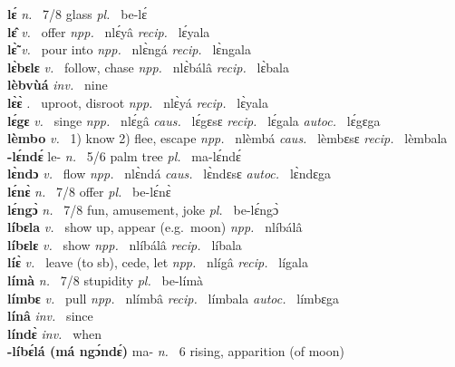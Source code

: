{\bfseries lɛ́}  {\itshape n.~} 7/8 glass {\itshape pl.~} be-lɛ́    \\ 
{\bfseries lɛ̂}  {\itshape v.~} offer   {\itshape npp.~} nlɛ́yâ {\itshape recip.~} lɛ́yala  \\ 
{\bfseries lɛ̃̀}  {\itshape v.~} pour into   {\itshape npp.~} nlɛ̀ngá {\itshape recip.~} lɛ̀ngala  \\ 
{\bfseries lɛ̀bɛlɛ}  {\itshape v.~} follow, chase   {\itshape npp.~} nlɛ̀bálâ {\itshape recip.~} lɛ̀bala  \\ 
{\bfseries lèbvùá}  {\itshape inv.~} nine    \\ 
{\bfseries lɛ̀ɛ̀}  {\itshape .~} uproot, disroot   {\itshape npp.~} nlɛ̀yá {\itshape recip.~} lɛ̀yala  \\ 
{\bfseries lɛ́gɛ}  {\itshape v.~} singe   {\itshape npp.~} nlɛ́gâ {\itshape caus.~} lɛ́gɛsɛ {\itshape recip.~} lɛ́gala {\itshape autoc.~} lɛ́gɛga  \\ 
{\bfseries lèmbo}  {\itshape v.~} 1) know 2) flee, escape   {\itshape npp.~} nlèmbá {\itshape caus.~} lèmbɛsɛ {\itshape recip.~} lèmbala \\ 
{\bfseries -lɛ́ndɛ́} le- {\itshape n.~} 5/6 palm tree {\itshape pl.~} ma-lɛ́ndɛ́    \\ 
{\bfseries lɛ̀ndɔ}  {\itshape v.~} flow   {\itshape npp.~} nlɛ̀ndá {\itshape caus.~} lɛ̀ndɛsɛ {\itshape autoc.~} lɛ̀ndɛga  \\ 
{\bfseries lɛ́nɛ̀}  {\itshape n.~} 7/8 offer {\itshape pl.~} be-lɛ́nɛ̀    \\ 
{\bfseries lɛ́ngɔ̀}  {\itshape n.~} 7/8 fun, amusement, joke {\itshape pl.~} be-lɛ́ngɔ̀    \\ 
{\bfseries líbɛla}  {\itshape v.~} show up, appear (e.g.\ moon)   {\itshape npp.~} nlíbálâ  \\ 
{\bfseries líbɛlɛ}  {\itshape v.~} show   {\itshape npp.~} nlíbálâ {\itshape recip.~} líbala  \\ 
{\bfseries líɛ̀}  {\itshape v.~} leave (to sb), cede, let   {\itshape npp.~} nlígâ {\itshape recip.~} lígala  \\ 
{\bfseries límà}  {\itshape n.~} 7/8 stupidity {\itshape pl.~} be-límà    \\ 
{\bfseries límbɛ}  {\itshape v.~} pull   {\itshape npp.~} nlímbâ {\itshape recip.~} límbala {\itshape autoc.~} límbɛga  \\ 
{\bfseries línâ}  {\itshape inv.~} since    \\ 
{\bfseries líndɛ̀}  {\itshape inv.~} when    \\ 
{\bfseries -líbɛ́lá (má ngɔ́ndɛ́)} ma- {\itshape n.~} 6  rising, apparition (of moon)    \\ 
